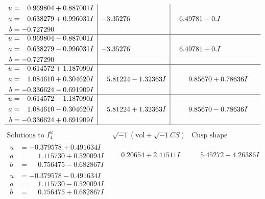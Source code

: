 \documentclass[1p]{elsarticle_modified}
\theoremstyle{definition}
\newcommand{\I}{\sqrt{-1}}
\begin{document}
$$\begin{array}{c|c|c}
\begin{aligned}
u &= \phantom{-}0.969804 + 0.887001 I \\
a &= \phantom{-}0.638279 + 0.996031 I \\
b &= -0.727290\phantom{ +0.000000I}\end{aligned}
 & -3.35276\phantom{ +0.000000I} & \phantom{-}6.49781 + 0. I\phantom{ +0.000000I} \\ \hline\begin{aligned}
u &= \phantom{-}0.969804 - 0.887001 I \\
a &= \phantom{-}0.638279 - 0.996031 I \\
b &= -0.727290\phantom{ +0.000000I}\end{aligned}
 & -3.35276\phantom{ +0.000000I} & \phantom{-}6.49781 + 0. I\phantom{ +0.000000I} \\ \hline\begin{aligned}
u &= -0.614572 + 1.187090 I \\
a &= \phantom{-}1.084610 + 0.304620 I \\
b &= -0.336624 - 0.691909 I\end{aligned}
 & \phantom{-}5.81224 - 1.32363 I & \phantom{-}9.85670 + 0.78636 I \\ \hline\begin{aligned}
u &= -0.614572 - 1.187090 I \\
a &= \phantom{-}1.084610 - 0.304620 I \\
b &= -0.336624 + 0.691909 I\end{aligned}
 & \phantom{-}5.81224 + 1.32363 I & \phantom{-}9.85670 - 0.78636 I\\
 \hline 
 \end{array}$$\newpage$$\begin{array}{c|c|c}  
\text{Solutions to }I^u_{4}& \I (\text{vol} + \sqrt{-1}CS) & \text{Cusp shape}\\
 \hline 
\begin{aligned}
u &= -0.379578 + 0.491634 I \\
a &= \phantom{-}1.115730 + 0.520094 I \\
b &= \phantom{-}0.756475 - 0.682867 I\end{aligned}
 & \phantom{-}0.20654 + 2.41511 I & \phantom{-}5.45272 - 4.26386 I \\ \hline\begin{aligned}
u &= -0.379578 - 0.491634 I \\
a &= \phantom{-}1.115730 - 0.520094 I \\
b &= \phantom{-}0.756475 + 0.682867 I\end{aligned}

\end{array}$$
\end{document}
